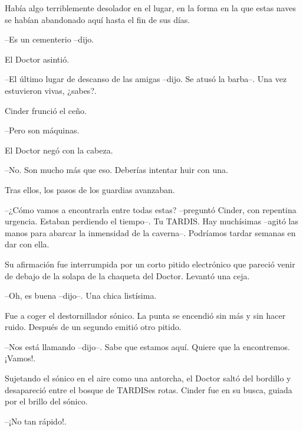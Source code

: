 Había algo terriblemente desolador en el lugar, en la forma en la que estas naves se habían abandonado aquí hasta el fin de sus días.

--Es un cementerio --dijo.



El Doctor asintió.



--El último lugar de descanso de las amigas --dijo. Se atusó la barba--. Una vez estuvieron vivas, ¿sabes?.



Cinder frunció el ceño.



--Pero son máquinas.



El Doctor negó con la cabeza.



--No. Son mucho más que eso. Deberías intentar huir con una.



Tras ellos, los pasos de los guardias avanzaban.



--¿Cómo vamos a encontrarla entre todas estas? --preguntó Cinder, con repentina urgencia. Estaban perdiendo el tiempo--. Tu TARDIS. Hay muchísimas --agitó las manos para abarcar la inmensidad de la caverna--. Podríamos tardar semanas en dar con ella.



Su afirmación fue interrumpida por un corto pitido electrónico que pareció venir de debajo de la solapa de la chaqueta del Doctor. Levantó una ceja.



--Oh, es buena --dijo--. Una chica listísima. 



Fue a coger el destornillador sónico. La punta se encendió sin más y sin hacer ruido. Después de un segundo emitió otro pitido.



--Nos está llamando --dijo--. Sabe que estamos aquí. Quiere que la encontremos. ¡Vamos!.



Sujetando el sónico en el aire como una antorcha, el Doctor saltó del bordillo y desapareció entre el bosque de TARDISes rotas. Cinder fue en su busca, guiada por el brillo del sónico.



--¡No tan rápido!.



